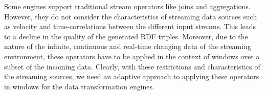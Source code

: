 Some engines support traditional stream operators like joins and aggregations. However, they do not consider
the characteristics of streaming data sources such as velocity and time-correlations between the different
input streams. This leads to a decline in the quality of the generated RDF triples. Moreover,
due to the nature of the infinite, continuous and real-time changing data of the streaming environment,
these operators have to be applied in the context of windows over a subset of the incoming data.
Clearly, with these restrictions and characteristics of the streaming sources, we need an adaptive approach
to applying these operators in windows for the data transformation engines.

